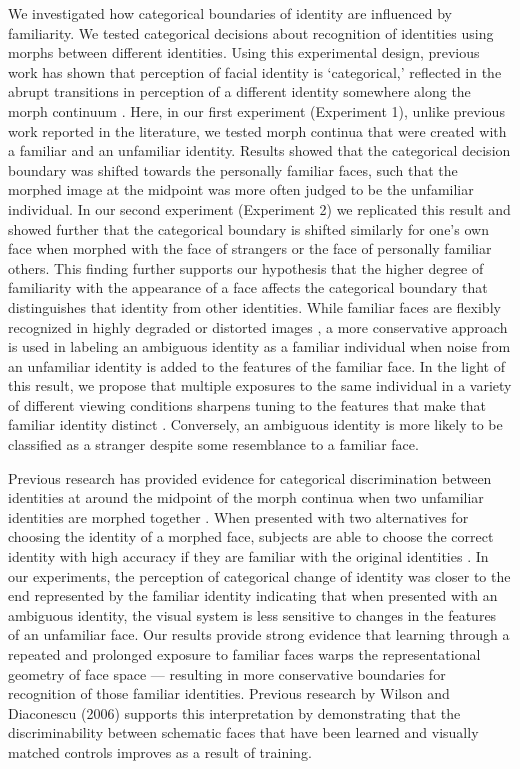\documentclass[10pt,letterpaper]{article}
\begin{document}
We investigated how categorical boundaries of identity are influenced by familiarity. We tested categorical decisions about recognition of identities using morphs between different identities. Using this experimental design, previous work has shown that perception of facial identity is ‘categorical,’ reflected in the abrupt transitions in perception of a different identity somewhere along the morph continuum \cite{beale1995categorical, rotshtein2005morphing, ramon2016real}. Here, in our first experiment (Experiment 1), unlike previous work reported in the literature, we tested morph continua that were created with a familiar and an unfamiliar identity. Results showed that the categorical decision boundary was shifted towards the personally familiar faces, such that the morphed image at the midpoint was more often judged to be the unfamiliar individual. In our second experiment (Experiment 2) we replicated this result and showed further that the categorical boundary is shifted similarly for one’s own face when morphed with the face of strangers or the face of personally familiar others. This finding further supports our hypothesis that the higher degree of familiarity with the appearance of a face affects the categorical boundary that distinguishes that identity from other identities. While familiar faces are flexibly recognized in highly degraded or distorted images \cite{sinha2006face, gilad2018recognizing}, a more conservative approach is used in labeling an ambiguous identity as a familiar individual when noise from an unfamiliar identity is added to the features of the familiar face. In the light of this result, we propose that multiple exposures to the same individual in a variety of different viewing conditions sharpens tuning to the features that make that familiar identity distinct \cite{tanaka1998mapping}. Conversely, an ambiguous identity is more likely to be classified as a stranger despite some resemblance to a familiar face.  

Previous research has provided evidence for categorical discrimination between identities at around the midpoint of the morph continua when two unfamiliar identities are morphed together \cite{beale1995categorical}.  When presented with two alternatives for choosing the identity of a morphed face, subjects are able to choose the correct identity with high accuracy if they are familiar with the original identities \cite{ramon2016real}. In our experiments, the perception of categorical change of identity was closer to the end represented by the familiar identity indicating that when presented with an ambiguous identity, the visual system is less sensitive to changes in the features of an unfamiliar face. Our results provide strong evidence that learning through a repeated and prolonged exposure to familiar faces warps the representational geometry of face space — resulting in more conservative boundaries for recognition of those familiar identities. Previous research by Wilson and Diaconescu (2006)\cite{wilson2006learning} supports this interpretation by demonstrating that the discriminability between schematic faces that have been learned and visually matched controls improves as a result of training. 
\end{document}
